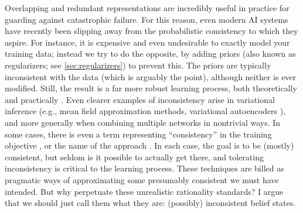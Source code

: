 Overlapping and redundant representations are incredibly useful in practice for guarding against catastrophic failure. 
%
For this reason, even modern AI systems have recently been slipping away from the probabilistic consistency to which they aspire.
%
For instance, it is expensive and even undesirable to exactly model your training data; instead we try to do the opposite, by adding priors (also known as regularizers; see \cref{sec:regularizers}) to prevent this.
The priors are typically inconsistent with the data (which is arguably the point), although neither is ever modified. 
Still, the result is a far more robust learning process, both theoretically 
\citep{ftrl-lecturenotes1,ftrl-lecturenotes2}
 and practically \citep{girosi1995regularization}.
%
Even clearer examples of inconsistency arise in variational inference
    (e.g., mean field approximation methods, variational autoencoders \citep{kingma2013autoencoding}),
    and more generally when combining multiple networks in nontrivial ways.
    In some cases, there is even a term representing ``consistency'' in the training objective \citep{CycleGAN2017}, or the name of the approach \citep{learning-loc-glob-consistency,temp-cycle-consist-2019CVPR}. 
In each case, the goal is to be (mostly) consistent, but seldom is it possible to actually get there,
and tolerating inconsistency is critical to the learning process.
%
These techniques are billed
    as pragmatic ways of approximating
    some presumably consistent we must have intended.
But why perpetuate these unrealistic rationality standards?
I argue that we should just call them what they are: (possibly) inconsistent belief states.

